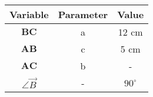 \begin{center}
    \begin{tabular}{|c|c|c|} 
        \hline
            \textbf{Variable} & \textbf{Parameter} & \textbf{Value} \\ 
        \hline
            $\boldsymbol{BC}$ & a & 12 cm \\ 
        \hline
            $\boldsymbol{AB}$ & c & 5 cm \\ 
        \hline
            $\boldsymbol{AC}$ & b &   -    \\
        \hline
            $\angle \vec{B}$  & -  & $90^\circ$ \\
        \hline
    \end{tabular}
\end{center}  
